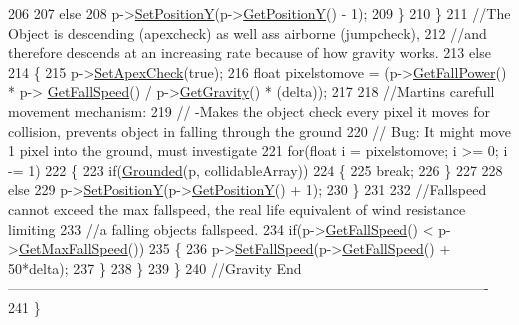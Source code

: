 \begin{DoxyCode}
206 
207                 \textcolor{keywordflow}{else}
208                     p->\hyperlink{classPlayerObject_a19962eed7a6cfd28af75d9d5e15cb27a}{SetPositionY}(p->\hyperlink{classPlayerObject_ad17b9ec44299f4dc9ca20064c883496b}{GetPositionY}() - 1);
209             \}
210         \}
211             \textcolor{comment}{//The Object is descending (apexcheck) as well ass airborne (jumpcheck),}
212             \textcolor{comment}{//and therefore descends at an increasing rate because of how gravity works.}
213         \textcolor{keywordflow}{else}
214         \{
215             p->\hyperlink{classPlayerObject_a6cd0c1faaf0d2cd1749d11a7e9e20ff8}{SetApexCheck}(\textcolor{keyword}{true});
216             \textcolor{keywordtype}{float} pixelstomove = (p->\hyperlink{classPlayerObject_af92460ccdd53dbc2ac844cc36c34908b}{GetFallPower}() * p->
      \hyperlink{classPlayerObject_a5f93613a07676e31931780ae1b64965a}{GetFallSpeed}() / p->\hyperlink{classPlayerObject_a6eeb8a060c9d5b6b4ca0104bf77aa346}{GetGravity}() * (delta));
217 
218             \textcolor{comment}{//Martins carefull movement mechanism:}
219             \textcolor{comment}{//  -Makes the object check every pixel it moves for collision, prevents object in falling
       through the ground}
220             \textcolor{comment}{//  Bug: It might move 1 pixel into the ground, must investigate}
221             \textcolor{keywordflow}{for}(\textcolor{keywordtype}{float} i = pixelstomove; i >= 0; i -= 1)
222             \{
223                 \textcolor{keywordflow}{if}(\hyperlink{classPhysics_aba2e0af80edf40eb938413c3f5b84dbf}{Grounded}(p, collidableArray))
224                 \{
225                     \textcolor{keywordflow}{break};
226                 \}
227 
228                 \textcolor{keywordflow}{else}
229                     p->\hyperlink{classPlayerObject_a19962eed7a6cfd28af75d9d5e15cb27a}{SetPositionY}(p->\hyperlink{classPlayerObject_ad17b9ec44299f4dc9ca20064c883496b}{GetPositionY}() + 1);
230             \}
231 
232             \textcolor{comment}{//Fallspeed cannot exceed the max fallspeed, the real life equivalent of wind resistance
       limiting}
233             \textcolor{comment}{//a falling objects fallspeed.}
234             \textcolor{keywordflow}{if}(p->\hyperlink{classPlayerObject_a5f93613a07676e31931780ae1b64965a}{GetFallSpeed}() < p->\hyperlink{classPlayerObject_a980dabd2d14fa5583ed08d9f6349270f}{GetMaxFallSpeed}())
235             \{
236                 p->\hyperlink{classPlayerObject_a4b3506e5454430af8634eecda17a9f70}{SetFallSpeed}(p->\hyperlink{classPlayerObject_a5f93613a07676e31931780ae1b64965a}{GetFallSpeed}() + 50*delta);
237             \}
238         \}
239     \}
240     \textcolor{comment}{//Gravity
       End-------------------------------------------------------------------------------------------------------}
241 \}
\end{DoxyCode}
